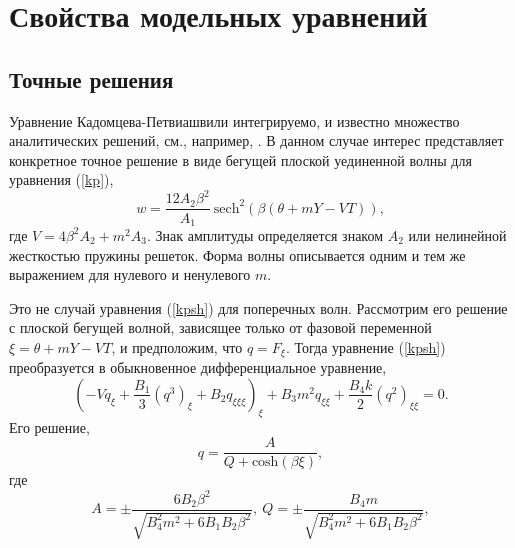 \section{Свойства модельных уравнений}

\subsection{Точные решения}

Уравнение Кадомцева-Петвиашвили интегрируемо, и известно множество аналитических решений, см., например, \cite{Ablowitz}. В данном случае интерес представляет конкретное точное решение в виде бегущей плоской уединенной волны для уравнения (\ref {kp}),
\begin{equation}
	w=\frac{12A_2 \beta^2}{A_1}~{\text{sech}}^2\left(\beta( \theta+m Y - V T)\right), \label{solkp}
\end{equation}
где $V=4\beta^2 A_2+m^2 A_3 $. 
Знак амплитуды определяется знаком $A_2$ или нелинейной жесткостью пружины решеток. Форма волны описывается одним и тем же выражением для нулевого и ненулевого $m$.

Это не случай уравнения (\ref{kpsh}) для поперечных волн. Рассмотрим его решение с плоской бегущей волной, зависящее только от фазовой переменной $\xi = \theta + m Y - V T$, и предположим, что $ q = F_\xi $. Тогда уравнение (\ref {kpsh}) преобразуется в обыкновенное дифференциальное уравнение,
\[
(-V q_\xi+\frac{B_1}{3} (q^3)_\xi+B_2 q_{\xi\xi\xi})_\xi+B_3m^2  q_{\xi\xi} +\frac{B_4 k}{2} (q^2)_{\xi\xi}=0.
\]
Его решение,
\begin{equation}
	q=\frac{A}{Q+{\text{cosh}( \beta \xi)}},\label{solshear}
\end{equation}
где
\[
	A=\pm \frac{6B_2 \beta^2}{\sqrt{B_4^2 m^2+6 B_1 B_2 \beta^2}}, 
	~Q=\pm\frac{B_4 m }{\sqrt{B_4^2 m^2+6 B_1 B_2 \beta^2}},
\]

